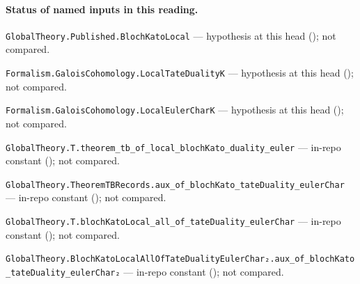 

\paragraph{Status of named inputs in this reading.}
\noindent\nolinkurl{GlobalTheory.Published.BlochKatoLocal} --- hypothesis at this head (); not compared.\par
\noindent\nolinkurl{Formalism.GaloisCohomology.LocalTateDualityK} --- hypothesis at this head (); not compared.\par
\noindent\nolinkurl{Formalism.GaloisCohomology.LocalEulerCharK} --- hypothesis at this head (); not compared.\par
\noindent\nolinkurl{GlobalTheory.T.theorem_tb_of_local_blochKato_duality_euler} --- in-repo constant (); not compared.\par
\noindent\nolinkurl{GlobalTheory.TheoremTBRecords.aux_of_blochKato_tateDuality_eulerChar} --- in-repo constant (); not compared.\par
\noindent\nolinkurl{GlobalTheory.T.blochKatoLocal_all_of_tateDuality_eulerChar} --- in-repo constant (); not compared.\par
\noindent\nolinkurl{GlobalTheory.BlochKatoLocalAllOfTateDualityEulerChar₂.aux_of_blochKato_tateDuality_eulerChar₂} --- in-repo constant (); not compared.\par

